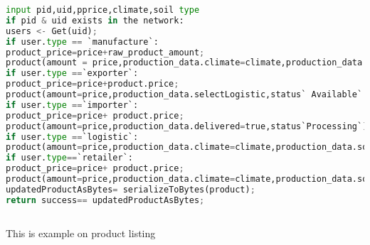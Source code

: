 \begin{lstlisting}[language=Python , caption=product listing]
input pid,uid,pprice,climate,soil type
if pid & uid exists in the network:
users <- Get(uid);
if user.type == `manufacture`:
product_price=price+raw_product_amount;
product(amount = price,production_data.climate=climate,production_data.soil_type=soil_type,status`Available`,product.availableFor=`exporter`)
if user.type ==`exporter`:
product_price=price+product.price;
product(amount=price,production_data.selectLogistic,status` Available` ,product.availableFor=`importer`)
if user.type ==`importer`:
product_price=price+ product.price;
product(amount=price,production_data.delivered=true,status`Processing`)
if user.type ==`logistic`:
product(amount=price,production_data.climate=climate,production_data.soil_type=soil_type,status`Available` ,product.availableFor=`retailer`)
if user.type==`retailer`:
product_price=price+ product.price;
product(amount=price,production_data.climate=climate,production_data.soil_type=soil_type,status`Available` ,product.availableFor=`consumer`)
updatedProductAsBytes= serializeToBytes(product);
return success== updatedProductAsBytes;
      
\end{lstlisting}
    This is example on product listing